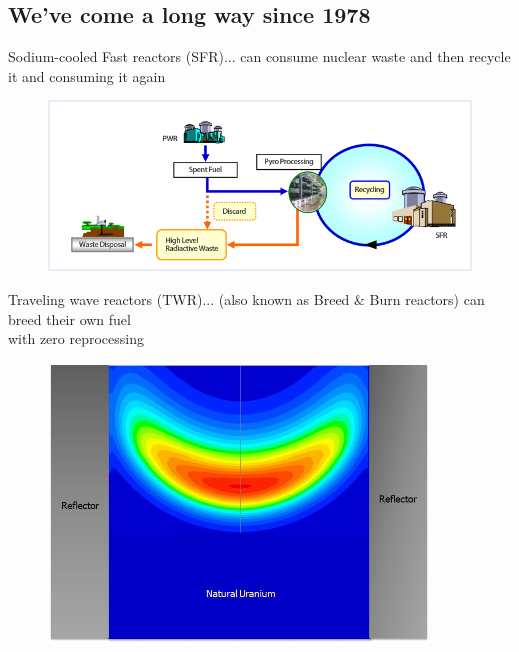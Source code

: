 \documentclass{beamer}
\begin{document}
    \subsection{We've come a long way since 1978}

        \begin{frame}{Sodium-cooled Fast reactors (SFR)}{... can consume nuclear waste and then recycle it and consuming it again}
            \begin{figure}
                \centering
                \includegraphics[width=1.0\textwidth]{./img/fastCycle.png}
                \caption*{}
            \end{figure}
        \end{frame}

        \begin{frame}{Traveling wave reactors (TWR)}{... (also known as Breed \& Burn reactors) can breed their own fuel \\ with zero reprocessing}
            \begin{figure}
                \centering
                \includegraphics[width=0.9\textwidth]{./img/candle.png}
                \caption*{}
            \end{figure}
        \end{frame}
\end{document}

